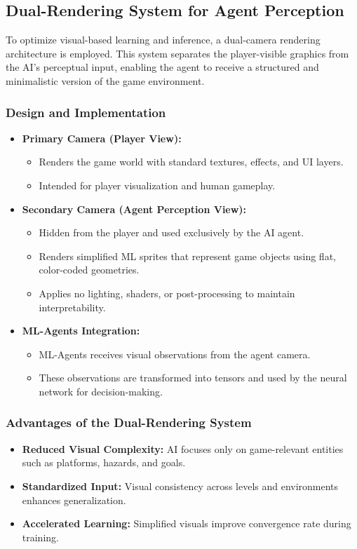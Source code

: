 \documentclass[12pt,oneside,openright,a4paper]{cpe-english-project}
\begin{document}
\subsection{Dual-Rendering System for Agent Perception}
To optimize visual-based learning and inference, a dual-camera rendering architecture is employed. This system separates the player-visible graphics from the AI’s perceptual input, enabling the agent to receive a structured and minimalistic version of the game environment.
\subsubsection{Design and Implementation}
\begin{itemize}
\item \textbf{Primary Camera (Player View):}
\begin{itemize}
\item Renders the game world with standard textures, effects, and UI layers.
\item Intended for player visualization and human gameplay.
\end{itemize}
\item \textbf{Secondary Camera (Agent Perception View):}
\begin{itemize}
    \item Hidden from the player and used exclusively by the AI agent.
    \item Renders simplified ML sprites that represent game objects using flat, color-coded geometries.
    \item Applies no lighting, shaders, or post-processing to maintain interpretability.
\end{itemize}

\item \textbf{ML-Agents Integration:}
\begin{itemize}
    \item ML-Agents receives visual observations from the agent camera.
    \item These observations are transformed into tensors and used by the neural network for decision-making.
\end{itemize}
\end{itemize}
\subsubsection{Advantages of the Dual-Rendering System}
\begin{itemize}
\item \textbf{Reduced Visual Complexity:} AI focuses only on game-relevant entities such as platforms, hazards, and goals.
\item \textbf{Standardized Input:} Visual consistency across levels and environments enhances generalization.
\item \textbf{Accelerated Learning:} Simplified visuals improve convergence rate during training.
\end{itemize}
\end{document}

